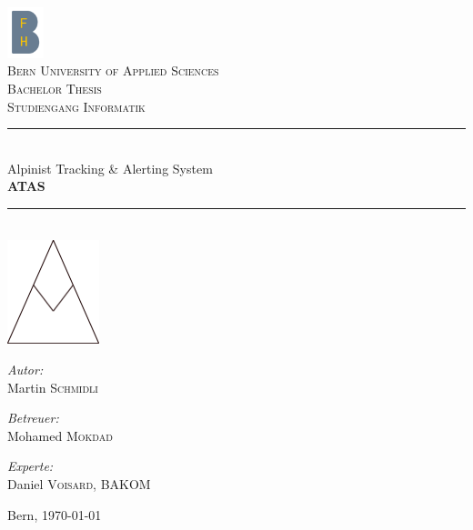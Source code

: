 \documentclass[11pt,english,german]{report}
\theoremstyle{definition}
\begin{document}
\pagestyle{empty} %
\begin{titlepage}
\begin{center}

\includegraphics[width=0.08\textwidth]{img/bfh_logo.png}\\[1cm]    
\textsc{\LARGE Bern University of Applied Sciences}\\[1.5cm]
\textsc{\Large Bachelor Thesis}\\[0.2cm]
\textsc{\Large Studiengang Informatik}\\[0.5cm]

\newcommand{\HRule}{\rule{\linewidth}{0.3mm}}
\HRule \\[0.4cm]
{\huge Alpinist Tracking \& Alerting System}\\[0.3cm]
{\huge \bfseries  ATAS}
\HRule \\[2cm]

\includegraphics[width=0.2\textwidth]{img/atas_logo.png}\\[2.5cm]    

\begin{minipage}{0.3\textwidth}
\begin{flushleft} \large
\emph{Autor:}\\
Martin \textsc{Schmidli}\\
\end{flushleft}
\end{minipage}
\hfill
\begin{minipage}{0.3\textwidth}
\begin{flushleft} \large
\emph{Betreuer:} \\
Mohamed \textsc{Mokdad}
\end{flushleft}
\end{minipage}
\hfill
\begin{minipage}{0.38\textwidth}
\begin{flushleft} \large
\emph{Experte:}\\
Daniel \textsc{Voisard}, BAKOM\\
\end{flushleft}
\end{minipage}

\vspace{20mm}

Bern, {\large \today}
\end{center}
\end{titlepage}
\pagestyle{fancy}
\end{document}
